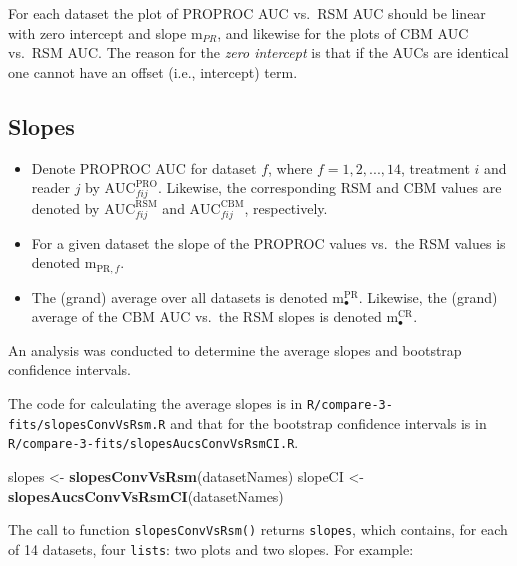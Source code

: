 \documentclass[
]{book}
\newenvironment{Shaded}{\begin{snugshade}}{\end{snugshade}}
\newcommand{\KeywordTok}[1]{\textcolor[rgb]{0.13,0.29,0.53}{\textbf{#1}}}
\newcommand{\NormalTok}[1]{#1}
\newcommand{\StringTok}[1]{\textcolor[rgb]{0.31,0.60,0.02}{#1}}
\begin{document}
For each dataset the plot of PROPROC AUC vs.~RSM AUC should be linear with zero intercept and slope \(\text{m}_{PR}\), and likewise for the plots of CBM AUC vs.~RSM AUC. The reason for the \emph{zero intercept} is that if the AUCs are identical one cannot have an offset (i.e., intercept) term.

\hypertarget{rsm-3-fits-slopes}{%
\subsection{Slopes}\label{rsm-3-fits-slopes}}

\begin{itemize}
\item
  Denote PROPROC AUC for dataset \(f\), where \(f=1,2,...,14\), treatment \(i\) and reader \(j\) by \(\text{AUC}^{\text{PRO}}_{fij}\). Likewise, the corresponding RSM and CBM values are denoted by \(\text{AUC}^{\text{RSM}}_{fij}\) and \(\text{AUC}^{\text{CBM}}_{fij}\), respectively.
\item
  For a given dataset the slope of the PROPROC values vs.~the RSM values is denoted \(\text{m}_{\text{PR},f}\).
\item
  The (grand) average over all datasets is denoted \(\text{m}^{\text{PR}}_\bullet\). Likewise, the (grand) average of the CBM AUC vs.~the RSM slopes is denoted \(\text{m}^{\text{CR}}_\bullet\).
\end{itemize}

An analysis was conducted to determine the average slopes and bootstrap confidence intervals.

The code for calculating the average slopes is in \texttt{R/compare-3-fits/slopesConvVsRsm.R} and that for the bootstrap confidence intervals is in \texttt{R/compare-3-fits/slopesAucsConvVsRsmCI.R}.

\begin{Shaded}
\begin{Highlighting}[]
\NormalTok{slopes <-}\StringTok{ }\KeywordTok{slopesConvVsRsm}\NormalTok{(datasetNames)}
\NormalTok{slopeCI <-}\StringTok{ }\KeywordTok{slopesAucsConvVsRsmCI}\NormalTok{(datasetNames)}
\end{Highlighting}
\end{Shaded}

The call to function \texttt{slopesConvVsRsm()} returns \texttt{slopes}, which contains, for each of 14 datasets, four \texttt{lists}: two plots and two slopes. For example:
\end{document}
